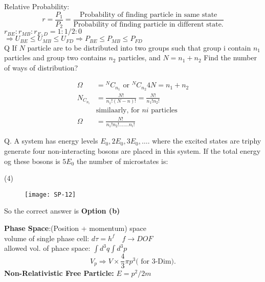 Relative Probability: \\
$$r=\frac{P_1}{P_2}=\frac{\text{Probability of finding particle in same state}}{\text{Probability of finding particle in different state.}}$$
$r_{B E}: r_{M B}: r_{F \cdot D}=1: 1 / 2: 0$\\
$\Rightarrow U_{B E} \leqslant U_{M B} \leqslant U_{F D} \Rightarrow P_{B E} \leqslant P_{M B} \leqslant P_{F D}$ \\
Q If $N$ particle are to be distributed into two groups such that group i contain $n_1$ particles and group two contains $n_2$ particles, and $N=n_1+n_2$ Find the number of ways of distribution?
\begin{answer}
	\begin{align*}
	\Omega&={ }^{N} C_{n_{1}} \text { or }{ }^{N} C_{n_{2}} 4 N=n_{1}+n_{2}\\
	N_{C_{n_{i}}}&=\frac{N !}{n_{1} !(N-n) !}=\frac{N !}{n_{1} ! n_{2} !}\\
	&\text{similaarly, for $ni$ particles}\\
	\Omega&=\frac{N!}{n_1!n_2!.......n_i!}
	\end{align*}
\end{answer}
Q. A system has energy levels $E_{0}, 2 E_{0}, 3 E_{0}, \ldots .$ where the excited states are triphy generate four non-interacting bosons are placed in this system. If the total energy og these bosons is $5E_0$ the number of microstates is:
 \begin{tasks}(4)
\end{tasks}
\begin{answer}
	\begin{figure}[H]
		\centering
		\texttt{[image: SP-12]}
	\end{figure}
	So the correct answer is \textbf{Option (b)}
\end{answer}
\textbf{Phase Space}:(Position + momentum) space\\
volume of single phase cell: $d \tau=h^{f} \quad f \rightarrow D O F$\\
allowed vol. of phace space: $\int d^{3} q \int d^{3} p$\\
$$
V_{p} \Rightarrow V \times \frac{4}{3} \pi p^{3}\text{( for 3-Dim).}
$$
\textbf{Non-Relativistic Free Particle: }$E=p^2/2m$\\
\renewcommand*{\arraystretch}{1.8}
